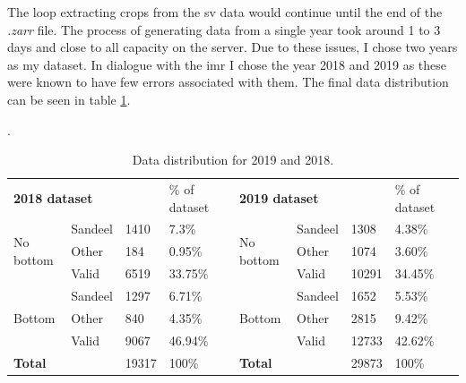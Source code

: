         The loop extracting crops from the \gls{sv} data would continue until the end of the \textit{.zarr} file. The process of generating data from a single year took around 1 to 3 days and close to all capacity on the server. Due to these issues, I chose two years as my dataset. In dialogue with the \gls{imr} I chose the year 2018 and 2019 as these were known to have few errors associated with them. The final data distribution can be seen in table \ref{data_distribution_table}.
        
        \begin{table}[H]
        \caption[Data distribution]{Data distribution for 2019 and 2018.}.
        \begin{tabular}{|llll|l|l|lllll|l|l}
        \cline{1-5} \cline{7-12}
        \multicolumn{4}{|l|}{\textbf{2018 dataset}}                                             & \% of dataset &  & \multicolumn{5}{l|}{\textbf{2019 dataset}}                                             & \% of dataset &  \\ \cline{1-5} \cline{7-12}
        \multicolumn{2}{|l|}{\multirow{3}{*}{No bottom}} & \multicolumn{1}{l|}{Sandeel} & 1410  & 7.3\%         &  & \multicolumn{3}{l|}{\multirow{3}{*}{No bottom}} & \multicolumn{1}{l|}{Sandeel} & 1308  & 4.38\%        &  \\ \cline{3-5} \cline{10-12}
        \multicolumn{2}{|l|}{}                           & \multicolumn{1}{l|}{Other}   & 184   & 0.95\%        &  & \multicolumn{3}{l|}{}                           & \multicolumn{1}{l|}{Other}   & 1074  & 3.60\%         &  \\ \cline{3-5} \cline{10-12}
        \multicolumn{2}{|l|}{}                           & \multicolumn{1}{l|}{Valid}   & 6519  & 33.75\%       &  & \multicolumn{3}{l|}{}                           & \multicolumn{1}{l|}{Valid}   & 10291 & 34.45\%       &  \\ \cline{1-5} \cline{7-12}
        \multicolumn{2}{|l|}{\multirow{3}{*}{Bottom}}    & \multicolumn{1}{l|}{Sandeel} & 1297  & 6.71\%        &  & \multicolumn{3}{l|}{\multirow{3}{*}{Bottom}}    & \multicolumn{1}{l|}{Sandeel} & 1652  & 5.53\%        &  \\ \cline{3-5} \cline{10-12}
        \multicolumn{2}{|l|}{}                           & \multicolumn{1}{l|}{Other}   & 840   & 4.35\%        &  & \multicolumn{3}{l|}{}                           & \multicolumn{1}{l|}{Other}   & 2815  & 9.42\%        &  \\ \cline{3-5} \cline{10-12}
        \multicolumn{2}{|l|}{}                           & \multicolumn{1}{l|}{Valid}   & 9067  & 46.94\%       &  & \multicolumn{3}{l|}{}                           & \multicolumn{1}{l|}{Valid}   & 12733 & 42.62\%       &  \\ \cline{1-5} \cline{7-12}
        \multicolumn{3}{|l|}{\textbf{Total}}                                            & 19317 & 100\%         &  & \multicolumn{4}{l|}{\textbf{Total}}                                            & 29873 & 100\%         &  \\ \cline{1-5} \cline{7-12}
        \end{tabular}
        \label{data_distribution_table}
        \end{table}
        
